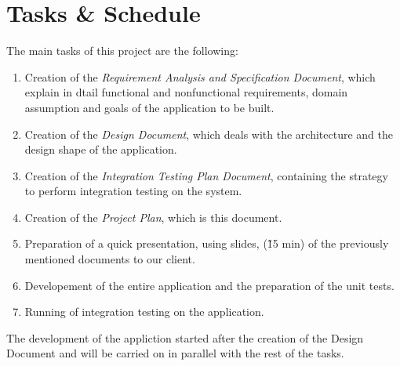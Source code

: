 \section{Tasks \& Schedule}

The main tasks of this project are the following:
\begin{enumerate}
    \item Creation of the \emph{Requirement Analysis and Specification Document}, which explain in dtail functional and nonfunctional requirements, domain assumption and goals of the application to be built.
    \item Creation of the \emph{Design Document}, which deals with the architecture and the design shape of the application.
    \item Creation of the \emph{Integration Testing Plan Document}, containing the strategy to perform integration testing on the system.
    \item Creation of the \emph{Project Plan}, which is this document.
    \item Preparation of a quick presentation, using slides, (\~15 min) of the previously mentioned documents to our client.
    \item Developement of the entire application and the preparation of the unit tests.
    \item Running of integration testing on the application.
\end{enumerate}

The development of the appliction started after the creation of the Design Document and will be carried on in parallel with the rest of the tasks. 

